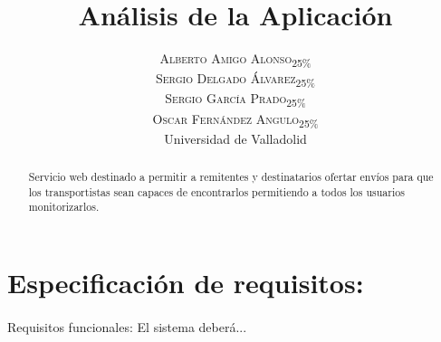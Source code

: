 \documentclass[10pt, a4paper,spanish]{article}
\title{\vspace{-15mm}\fontsize{24pt}{10pt}\selectfont\textbf{Análisis de la Aplicación}} %
\author{
\large
\textsc{Alberto Amigo Alonso\textsubscript{25\%}}\\[2mm] %
\textsc{Sergio Delgado Álvarez\textsubscript{25\%}}\\[2mm] %
\textsc{Sergio García Prado\textsubscript{25\%}}\\[2mm] %
\textsc{Oscar Fernández Angulo\textsubscript{25\%}}\\[2mm] %
\normalsize Universidad de Valladolid \\ %
\vspace{-5mm}
}
\date{}
\begin{document}
	\maketitle %

	\thispagestyle{fancy} %


	\begin{abstract}
		\noindent Servicio web destinado a permitir a remitentes y destinatarios ofertar envíos para que los transportistas sean capaces de encontrarlos permitiendo a todos los usuarios monitorizarlos.
	\end{abstract}

	\section{Especificación de requisitos:}

		\paragraph{}
		Requisitos funcionales: El sistema deberá...
\end{document}
